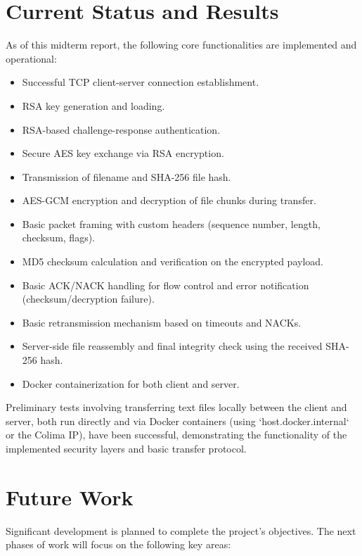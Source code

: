 \documentclass[11pt]{article}
\begin{document}
\section{Current Status and Results}
\label{sec:status}
As of this midterm report, the following core functionalities are implemented and operational:
\begin{itemize}
    \item Successful TCP client-server connection establishment.
    \item RSA key generation and loading.
    \item RSA-based challenge-response authentication.
    \item Secure AES key exchange via RSA encryption.
    \item Transmission of filename and SHA-256 file hash.
    \item AES-GCM encryption and decryption of file chunks during transfer.
    \item Basic packet framing with custom headers (sequence number, length, checksum, flags).
    \item MD5 checksum calculation and verification on the encrypted payload.
    \item Basic ACK/NACK handling for flow control and error notification (checksum/decryption failure).
    \item Basic retransmission mechanism based on timeouts and NACKs.
    \item Server-side file reassembly and final integrity check using the received SHA-256 hash.
    \item Docker containerization for both client and server.
\end{itemize}
Preliminary tests involving transferring text files locally between the client and server, both run directly and via Docker containers (using `host.docker.internal` or the Colima IP), have been successful, demonstrating the functionality of the implemented security layers and basic transfer protocol.

\section{Future Work}
\label{sec:future_work}
Significant development is planned to complete the project's objectives. The next phases of work will focus on the following key areas:
\end{document}
